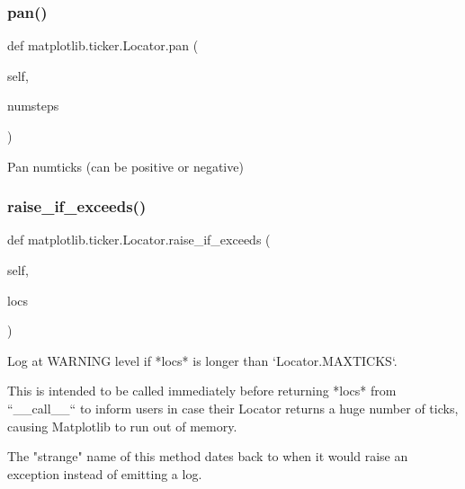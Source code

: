 \subsubsection{\texorpdfstring{pan()}{pan()}}
{\footnotesize\ttfamily def matplotlib.\+ticker.\+Locator.\+pan (\begin{DoxyParamCaption}\item[{}]{self,  }\item[{}]{numsteps }\end{DoxyParamCaption})}

\begin{DoxyVerb}Pan numticks (can be positive or negative)\end{DoxyVerb}
 \mbox{\label{classmatplotlib_1_1ticker_1_1Locator_a0988fbd430958f81cef4cf2a1ee2e823}} 
\subsubsection{\texorpdfstring{raise\+\_\+if\+\_\+exceeds()}{raise\_if\_exceeds()}}
{\footnotesize\ttfamily def matplotlib.\+ticker.\+Locator.\+raise\+\_\+if\+\_\+exceeds (\begin{DoxyParamCaption}\item[{}]{self,  }\item[{}]{locs }\end{DoxyParamCaption})}

\begin{DoxyVerb}Log at WARNING level if *locs* is longer than `Locator.MAXTICKS`.

This is intended to be called immediately before returning *locs* from
``__call__`` to inform users in case their Locator returns a huge
number of ticks, causing Matplotlib to run out of memory.

The "strange" name of this method dates back to when it would raise an
exception instead of emitting a log.
\end{DoxyVerb}
 \mbox{\label{classmatplotlib_1_1ticker_1_1Locator_a6eb9f0e5e37cb3a796ffd6fadec5edca}} 
